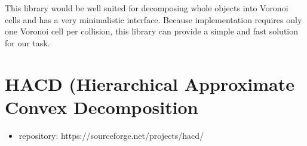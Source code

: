 This library would be well suited for decomposing whole objects into Voronoi cells and has a very minimalistic interface. Because implementation requires only one Voronoi cell per collision, this library can provide a simple and fast solution for our task.

\section{HACD (Hierarchical Approximate Convex Decomposition}
\begin{itemize}
\item repository: https://sourceforge.net/projects/hacd/
\end{itemize}
\cite{HACD}





